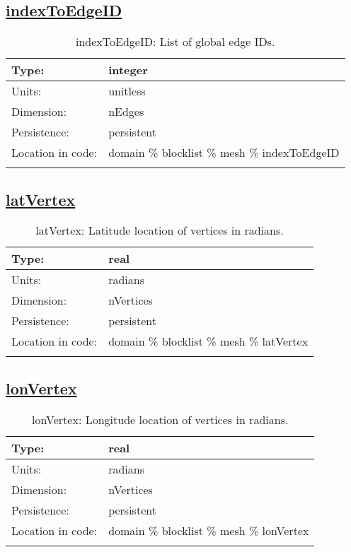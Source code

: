 \subsection[indexToEdgeID]{\hyperref[sec:var_tab_mesh]{indexToEdgeID}}
\label{subsec:var_sec_mesh_indexToEdgeID}
\begin{center}
\begin{longtable}{| p{2.0in} | p{4.0in} |}
        \hline 
        Type: & integer \\
        \hline 
        Units: & \si{unitless} \\
        \hline 
        Dimension: & nEdges \\
        \hline 
        Persistence: & persistent \\
        \hline 
         Location in code: & domain \% blocklist \% mesh \% indexToEdgeID \\
         \hline 
    \caption{indexToEdgeID: List of global edge IDs.}
\end{longtable}
\end{center}
\subsection[latVertex]{\hyperref[sec:var_tab_mesh]{latVertex}}
\label{subsec:var_sec_mesh_latVertex}
\begin{center}
\begin{longtable}{| p{2.0in} | p{4.0in} |}
        \hline 
        Type: & real \\
        \hline 
        Units: & \si{radians} \\
        \hline 
        Dimension: & nVertices \\
        \hline 
        Persistence: & persistent \\
        \hline 
         Location in code: & domain \% blocklist \% mesh \% latVertex \\
         \hline 
    \caption{latVertex: Latitude location of vertices in radians.}
\end{longtable}
\end{center}
\subsection[lonVertex]{\hyperref[sec:var_tab_mesh]{lonVertex}}
\label{subsec:var_sec_mesh_lonVertex}
\begin{center}
\begin{longtable}{| p{2.0in} | p{4.0in} |}
        \hline 
        Type: & real \\
        \hline 
        Units: & \si{radians} \\
        \hline 
        Dimension: & nVertices \\
        \hline 
        Persistence: & persistent \\
        \hline 
         Location in code: & domain \% blocklist \% mesh \% lonVertex \\
         \hline 
    \caption{lonVertex: Longitude location of vertices in radians.}
\end{longtable}
\end{center}
